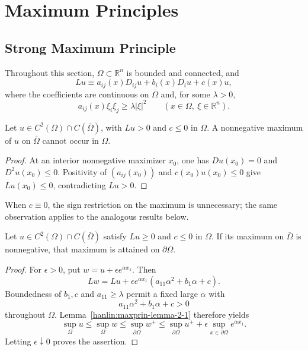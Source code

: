 \chapter{Maximum Principles}

\section{Strong Maximum Principle}\label{hanlin:maxprin-section-2-1}

Throughout this section, $\Omega\subset\mathbb{R}^n$ is bounded and connected, and
\[
Lu \equiv a_{ij}(x)D_{ij}u + b_i(x)D_iu + c(x)u,
\]
where the coefficients are continuous on $\overline\Omega$ and, for some
$\lambda>0$,
\[
a_{ij}(x)\xi_i\xi_j \ge \lambda |\xi|^2
\qquad (x\in\Omega,\ \xi\in\mathbb{R}^n).
\]

\begin{lemma}\label{hanlin:maxprin-lemma-2-1}
Let $u\in C^2(\Omega)\cap C(\overline\Omega)$, with $Lu>0$ and $c\le0$ in
$\Omega$. A nonnegative maximum of $u$ on $\overline\Omega$ cannot occur in
$\Omega$.
\end{lemma}
\begin{proof}
\sketch At an interior nonnegative maximizer $x_0$, one has $Du(x_0)=0$ and
$D^2u(x_0)\le0$. Positivity of $(a_{ij}(x_0))$ and $c(x_0)u(x_0)\le0$ give
$Lu(x_0)\le0$, contradicting $Lu>0$.
\end{proof}

\begin{remark}\label{hanlin:maxprin-remark-2-2}
When $c\equiv0$, the sign restriction on the maximum is unnecessary; the same
observation applies to the analogous results below.
\end{remark}

\begin{lemma}\label{hanlin:maxprin-lemma-2-3}
Let $u\in C^2(\Omega)\cap C(\overline\Omega)$ satisfy $Lu\ge0$ and $c\le0$ in
$\Omega$. If its maximum on $\overline\Omega$ is nonnegative, that maximum is
attained on $\partial\Omega$.
\end{lemma}
\begin{proof}
\sketch For $\epsilon>0$, put $w=u+\epsilon e^{\alpha x_1}$. Then
\[
Lw = Lu + \epsilon e^{\alpha x_1}(a_{11}\alpha^2 + b_1\alpha + c).
\]
Boundedness of $b_1,c$ and $a_{11}\ge\lambda$ permit a fixed large $\alpha$ with
\[
a_{11}\alpha^2+b_1\alpha+c>0
\]
throughout $\Omega$. Lemma~\ref{hanlin:maxprin-lemma-2-1} therefore yields
\[
\sup_{\Omega} u \le \sup_{\Omega} w \le \sup_{\partial \Omega} w^+
\le \sup_{\partial \Omega} u^+ + \epsilon \sup_{x \in \partial \Omega} e^{\alpha x_1}.
\]
Letting $\epsilon\downarrow0$ proves the assertion.
\end{proof}

